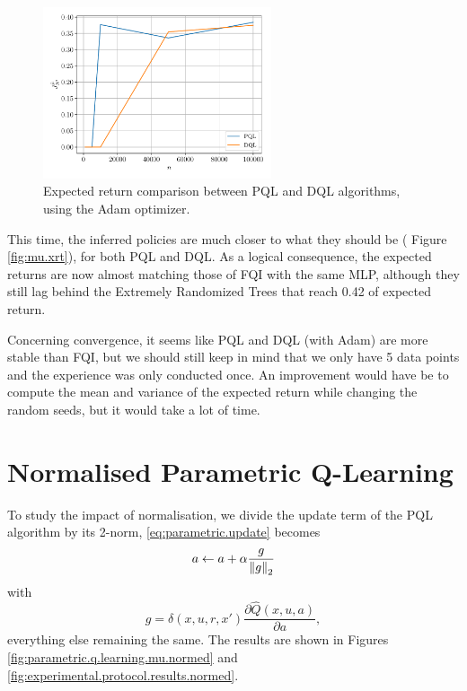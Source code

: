 \documentclass[a4paper, 12pt]{article}
\begin{document}
    \begin{figure}[h]
        \centering
        \includegraphics[width=0.6\textwidth]{resources/pdf/5_comparison_Adam.pdf}
        \caption{Expected return comparison between PQL and DQL algorithms, using the Adam optimizer.}
        \label{fig:pql.dql.adam.comparison}
    \end{figure}
    
    This time, the inferred policies are much closer to what they should be (\cf{} Figure \ref{fig:mu.xrt}), for both PQL and DQL. As a logical consequence, the expected returns are now almost matching those of FQI with the same MLP, although they still lag behind the Extremely Randomized Trees that reach \num{0.42} of expected return.
    
    Concerning convergence, it seems like PQL and DQL (with Adam) are more stable than FQI, but we should still keep in mind that we only have 5 data points and the experience was only conducted once. An improvement would have be to compute the mean and variance of the expected return while changing the random seeds, but it would take a lot of time.
    
    \newpage
    
    \section*{Normalised Parametric Q-Learning}
    
    To study the impact of normalisation, we divide the update term of the PQL algorithm by its 2-norm, \ie{} \eqref{eq:parametric.update} becomes
    \begin{equation}
        a \gets a + \alpha \frac{g}{\left\|g\right\|_2}
    \end{equation}
    with
    \begin{equation*}
        g = \delta(x, u, r, x') \frac{\partial \hat{Q}(x, u, a)}{\partial a} ,
    \end{equation*}
    everything else remaining the same. The results are shown in Figures \ref{fig:parametric.q.learning.mu.normed} and \ref{fig:experimental.protocol.results.normed}.
    
\end{document}
